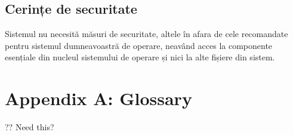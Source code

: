 \documentclass{scrreprt}
\begin{document}
\subsection{Cerințe de securitate}
Sistemul nu necesită măsuri de securitate, altele în afara de cele recomandate pentru sistemul dumneavoastră de operare, neavând acces la componente esențiale din nucleul sistemului de operare și nici la alte fișiere din sistem.

\section{Appendix A: Glossary}
?? Need this?
\end{document}

